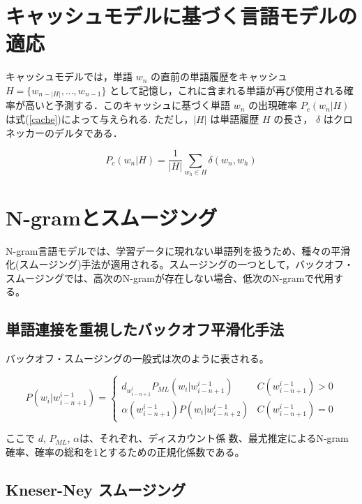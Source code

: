\section{キャッシュモデルに基づく言語モデルの適応}
キャッシュモデルでは，単語 $w_n$ の直前の単語履歴をキャッシュ $H = \{ w_{n-|H|}, ..., w_{n-1}\} $ として記憶し，これに含まれる単語が再び使用される確率が高いと予測する．このキャッシュに基づく単語 $w_n$ の出現確率 $P_c(w_n|H)$ は式(\ref{cache})によって与えられる. ただし，$|H|$ は単語履歴 $H$ の長さ， $\delta$ はクロネッカーのデルタである．

\begin{equation}
		P_c(w_n|H) = \frac{1}{|H|} \sum_{w_h \in H} \delta (w_n, w_h)
    \label{cache}
\end{equation}

\section{N-gramとスムージング}

N-gram言語モデルでは、学習データに現れない単語列を扱うため、種々の平滑化(スムージング)手法が適用される。スムージングの一つとして，バックオフ・スムージングでは、高次のN-gramが存在しない場合、低次のN-gramで代用する。

\subsection{単語連接を重視したバックオフ平滑化手法}
バックオフ・スムージングの一般式は次のように表される。

\begin{equation}
		P(w_i|w_{i-n+1}^{i-1}) = 
    \begin{cases} 
        d_{w_{i-n+1}^i} P_{ML}(w_i|w_{i-n+1}^{i-1}) & C(w_{i-n+1}^{i-1}) > 0\\ 
        \alpha(w_{i-n+1}^{i-1})P(w_i|w_{i-n+2}^{i-1}) & C(w_{i-n+1}^{i-1}) = 0
    \end{cases} 
    \label{ngram_smoosing1}
\end{equation}

ここで $d$, $P_{ML}$, $\alpha$は、それぞれ、ディスカウント係
数、最尤推定によるN-gram確率、確率の総和を1とするための正規化係数である。

\subsection{Kneser-Ney スムージング}

